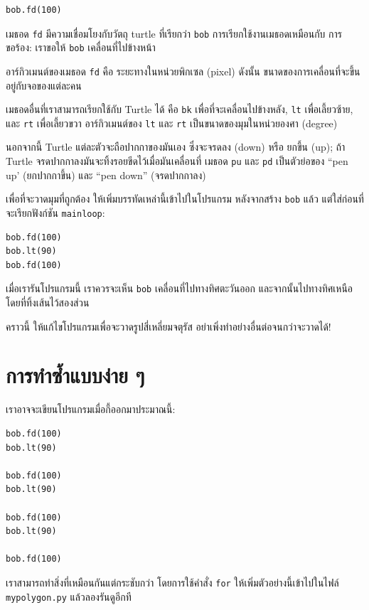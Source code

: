 \begin{verbatim}
bob.fd(100)
\end{verbatim}
%
เมธอด  {\tt fd} มีความเชื่อมโยงกับวัตถุ turtle ที่เรียกว่า {\tt bob} การเรียกใช้งานเมธอดเหมือนกับ
การขอร้อง: เราขอให้ {\tt bob} เคลื่อนที่ไปข้างหน้า

อาร์กิวเมนต์ของเมธอด {\tt fd} คือ ระยะทางในหน่วยพิกเซล (pixel) ดังนั้น ขนาดของการเคลื่อนที่จะขึ้น
อยู่กับจอของแต่ละคน

เมธอดอื่นที่เราสามารถเรียกใช้กับ Turtle ได้ คือ {\tt bk} เพื่อที่จะเคลื่อนไปข้างหลัง, {\tt lt} เพื่อเลี้ยวซ้าย, 
และ {\tt rt} เพื่อเลี้ยวขวา อาร์กิวเมนต์ของ {\tt lt} และ {\tt rt} เป็นขนาดของมุมในหน่วยองศา (degree)

นอกจากนี้ Turtle แต่ละตัวจะถือปากกาของมันเอง ซึ่งจะจรดลง (down) หรือ ยกขึ้น (up); 
ถ้า Turtle จรดปากกาลงมันจะทิ้งรอยขีดไว้เมื่อมันเคลื่อนที่  เมธอด {\tt pu} และ {\tt pd} 
เป็นตัวย่อของ ``pen up' (ยกปากกาขึ้น) และ ``pen down'' (จรดปากกาลง)

เพื่อที่จะวาดมุมที่ถูกต้อง ให้เพิ่มบรรทัดเหล่านี้เข้าไปในโปรแกรม หลังจากสร้าง {\tt bob} แล้ว
แต่ใส่ก่อนที่จะเรียกฟังก์ชัน \verb"mainloop":

\begin{verbatim}
bob.fd(100)
bob.lt(90)
bob.fd(100)
\end{verbatim}
%
เมื่อเรารันโปรแกรมนี้ เราควรจะเห็น {\tt bob} เคลื่อนที่ไปทางทิศตะวันออก และจากนั้นไปทางทิศเหนือ
โดยที่ทิ้งเส้นไว้สองส่วน

คราวนี้ ให้แก้ไขโปรแกรมเพื่อจะวาดรูปสี่เหลี่ยมจตุรัส อย่าเพิ่งทำอย่างอื่นต่อจนกว่าจะวาดได้!


\section{การทำซ้ำแบบง่าย ๆ}%
\label{repetition}

เราอาจจะเขียนโปรแกรมเมื่อกี้ออกมาประมาณนี้:

\begin{verbatim}
bob.fd(100)
bob.lt(90)

bob.fd(100)
bob.lt(90)

bob.fd(100)
bob.lt(90)

bob.fd(100)
\end{verbatim}
%
เราสามารถทำสิ่งที่เหมือนกันแต่กระชับกว่า โดยการใช้คำสั่ง {\tt for}  ให้เพิ่มตัวอย่างนี้เข้าไปในไฟล์ 
{\tt mypolygon.py} แล้วลองรันดูอีกที

